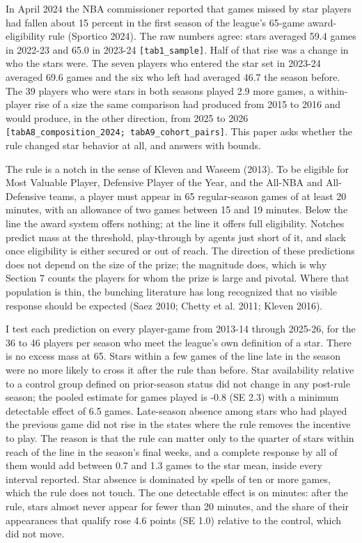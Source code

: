 \documentclass[11pt]{article}
\begin{document}
In April 2024 the NBA commissioner reported that games missed by star players had fallen about 15 percent in the first season of the league's 65-game award-eligibility rule (Sportico 2024). The raw numbers agree: stars averaged 59.4 games in 2022-23 and 65.0 in 2023-24 {\small\texttt{[tab1\_sample]}}. Half of that rise was a change in who the stars were. The seven players who entered the star set in 2023-24 averaged 69.6 games and the six who left had averaged 46.7 the season before. The 39 players who were stars in both seasons played 2.9 more games, a within-player rise of a size the same comparison had produced from 2015 to 2016 and would produce, in the other direction, from 2025 to 2026 {\small\texttt{[tabA8\_composition\_2024; tabA9\_cohort\_pairs]}}. This paper asks whether the rule changed star behavior at all, and answers with bounds.

The rule is a notch in the sense of Kleven and Waseem (2013). To be eligible for Most Valuable Player, Defensive Player of the Year, and the All-NBA and All-Defensive teams, a player must appear in 65 regular-season games of at least 20 minutes, with an allowance of two games between 15 and 19 minutes. Below the line the award system offers nothing; at the line it offers full eligibility. Notches predict mass at the threshold, play-through by agents just short of it, and slack once eligibility is either secured or out of reach. The direction of these predictions does not depend on the size of the prize; the magnitude does, which is why Section 7 counts the players for whom the prize is large and pivotal. Where that population is thin, the bunching literature has long recognized that no visible response should be expected (Saez 2010; Chetty et al. 2011; Kleven 2016).

I test each prediction on every player-game from 2013-14 through 2025-26, for the 36 to 46 players per season who meet the league's own definition of a star. There is no excess mass at 65. Stars within a few games of the line late in the season were no more likely to cross it after the rule than before. Star availability relative to a control group defined on prior-season status did not change in any post-rule season; the pooled estimate for games played is -0.8 (SE 2.3) with a minimum detectable effect of 6.5 games. Late-season absence among stars who had played the previous game did not rise in the states where the rule removes the incentive to play. The reason is that the rule can matter only to the quarter of stars within reach of the line in the season's final weeks, and a complete response by all of them would add between 0.7 and 1.3 games to the star mean, inside every interval reported. Star absence is dominated by spells of ten or more games, which the rule does not touch. The one detectable effect is on minutes: after the rule, stars almost never appear for fewer than 20 minutes, and the share of their appearances that qualify rose 4.6 points (SE 1.0) relative to the control, which did not move.
\end{document}
